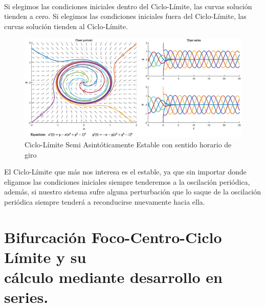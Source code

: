 \documentclass[12pt,a4paper]{report} %
\begin{document}
	\vspace{0.5cm}{\Large\textbullet\quad Ciclo-Límite Semi Asintóticamente Estable}\\[0.5cm]
	
	Si elegimos las condiciones iniciales dentro del Ciclo-Límite, las curvas solución tienden a cero. Si elegimos las condiciones iniciales fuera del Ciclo-Límite, las curvas solución tienden al Ciclo-Límite.
	
	\begin{figure}[h]
		\centering
		\includegraphics[width=1\textwidth]{clpe.eps}
		\caption{Ciclo-Límite Semi Asintóticamente Estable con sentido horario de giro}
		\label{fig:clpe}
	\end{figure}\smallskip
	\newpage
	
	El Ciclo-Límite que más nos interesa es el estable, ya que sin importar donde eligamos las condiciones iniciales siempre tenderemos a la oscilación periódica, además, si nuestro sistema sufre alguna perturbación que lo saque de la oscilación periódica siempre tenderá a reconducirse nuevamente hacia ella.
	
	\newpage
	
	\section{Bifurcación Foco-Centro-Ciclo Límite y su\\ cálculo mediante desarrollo en series.}
	
\end{document}
